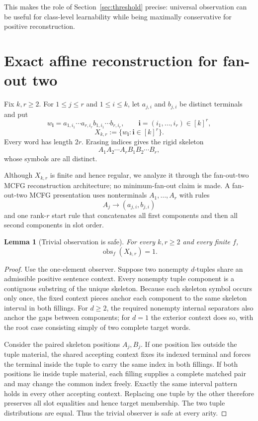 \documentclass[11pt]{article}
\newtheorem{lemma}[theorem]{Lemma}
\theoremstyle{definition}
\theoremstyle{remark}
\newcommand{\obs}{\operatorname{obs}}
\begin{document}
This makes the role of Section~\ref{sec:threshold} precise: universal
observation can be useful for class-level learnability while being maximally
conservative for positive reconstruction.
\section{Exact affine reconstruction for fan-out two}
\label{sec:X}

Fix \(k,r\ge2\).  For \(1\le j\le r\) and \(1\le i\le k\), let
\(a_{j,i}\) and \(b_{j,i}\) be distinct terminals and put
\[
 w_{\mathbf i}
 =
 a_{1,i_1}\cdots a_{r,i_r}
 b_{1,i_1}\cdots b_{r,i_r},
 \qquad
 \mathbf i=(i_1,\ldots,i_r)\in[k]^r,
\]
\[
 X_{k,r}:=\{w_{\mathbf i}:\mathbf i\in[k]^r\}.
\]
Every word has length \(2r\).  Erasing indices gives the rigid skeleton
\[
 A_1A_2\cdots A_rB_1B_2\cdots B_r,
\]
whose symbols are all distinct.

Although \(X_{k,r}\) is finite and hence regular, we analyze it through the
fan-out-two MCFG reconstruction architecture; no minimum-fan-out claim is made.
A fan-out-two MCFG presentation uses nonterminals
\(A_1,\ldots,A_r\) with rules
\[
 A_j\to(a_{j,i},b_{j,i})
\]
and one rank-\(r\) start rule that concatenates all first components and then
all second components in slot order.

\begin{lemma}[Trivial observation is safe]
\label{lem:X-safe}
For every \(k,r\ge2\) and every finite \(f\),
\[
 \obs_f(X_{k,r})=1.
\]
\end{lemma}

\begin{proof}
Use the one-element observer.  Suppose two nonempty \(d\)-tuples share an
admissible positive sentence context.  Every nonempty tuple component is a
contiguous substring of the unique skeleton.  Because each skeleton symbol
occurs only once, the fixed context pieces anchor each component to the same
skeleton interval in both fillings.  For \(d\ge2\), the required nonempty
internal separators also anchor the gaps between components; for \(d=1\) the
exterior context does so, with the root case consisting simply of two complete
target words.

Consider the paired skeleton positions \(A_j,B_j\).  If one position lies
outside the tuple material, the shared accepting context fixes its indexed
terminal and forces the terminal inside the tuple to carry the same index in
both fillings.  If both positions lie inside tuple material, each filling
supplies a complete matched pair and may change the common index freely.
Exactly the same interval pattern holds in every other accepting context.
Replacing one tuple by the other therefore preserves all slot equalities and
hence target membership.  The two tuple distributions are equal.  Thus the
trivial observer is safe at every arity.
\end{proof}
\end{document}
